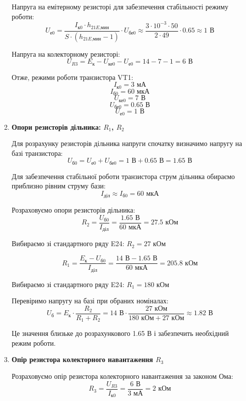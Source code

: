 \documentclass[main.tex]{subfiles}
\begin{document}
\begin{enumerate}
Напруга на емітерному резисторі для забезпечення стабільності режиму роботи:
\[U_{\text{е0}} = \frac{I_{\text{к0}} \cdot h_{21E\text{,мин}}}{S \cdot (h_{21E\text{,мин}} - 1)} \cdot U_{\text{бе0}} \approx \frac{3 \cdot 10^{-3} \cdot 50}{2 \cdot 49} \cdot 0.65 \approx 1\text{ В}\]

Напруга на колекторному резисторі:
\[U_{R3} = E_{\text{к}} - U_{\text{ке0}} - U_{\text{е0}} = 14 - 7 - 1 = 6\text{ В}\]

Отже, режими роботи транзистора VT1:
\[I_{\text{к0}} = 3\text{ мА}\]
\[I_{\text{б0}} = 60\text{ мкА}\]
\[U_{\text{ке0}} = 7\text{ В}\]
\[U_{\text{бе0}} = 0.65\text{ В}\]
\[U_{\text{е0}} = 1\text{ В}\]

\item \textbf{Опори резисторів дільника: $R_1$, $R_2$} \newline

Для розрахунку резисторів дільника напруги спочатку визначимо напругу на базі транзистора:
\[U_{\text{б0}} = U_{\text{е0}} + U_{\text{бе0}} = 1\text{ В} + 0.65\text{ В} = 1.65\text{ В}\]

Для забезпечення стабільної роботи транзистора струм дільника обираємо приблизно рівним струму бази:
\[I_{\text{діл}} \approx I_{\text{б0}} = 60\text{ мкА}\]

Розраховуємо опори резисторів дільника:
\[R_2 = \frac{U_{\text{б0}}}{I_{\text{діл}}} = \frac{1.65\text{ В}}{60\text{ мкА}} = 27.5\text{ кОм}\]

Вибираємо зі стандартного ряду E24: $R_2 = 27\text{ кОм}$

\[R_1 = \frac{E_{\text{к}} - U_{\text{б0}}}{I_{\text{діл}}} = \frac{14\text{ В} - 1.65\text{ В}}{60\text{ мкА}} = 205.8\text{ кОм}\]

Вибираємо зі стандартного ряду E24: $R_1 = 180\text{ кОм}$

Перевіримо напругу на базі при обраних номіналах:
\[U_{\text{б}} = E_{\text{к}} \cdot \frac{R_2}{R_1 + R_2} = 14\text{ В} \cdot \frac{27\text{ кОм}}{180\text{ кОм} + 27\text{ кОм}} \approx 1.82\text{ В}\]

Це значення близьке до розрахункового 1.65 В і забезпечить необхідний режим роботи.

\item \textbf{Опір резистора колекторного навантаження $R_3$} \newline

Розраховуємо опір резистора колекторного навантаження за законом Ома:
\[
R_3 = \frac{U_{R3}}{I_{\text{к0}}} = \frac{6\text{ В}}{3\text{ мА}} = 2\text{ кОм}
\]


\end{enumerate}
\end{document}
